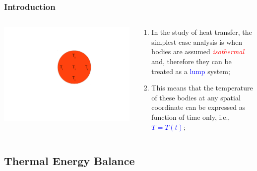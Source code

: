\documentclass[10pt,compress,unknownkeysallowed]{beamer}
\newcommand{\red}{\textcolor{red}}
\newcommand{\blue}{\textcolor{blue}}
\begin{document}
\begin{frame}
 \frametitle{Introduction}
   \begin{columns}
     \begin{column}[l]{0.5\linewidth}
        \begin{center}
          \includegraphics[width=\columnwidth,clip]{./Pics/Lumped1}
        \end{center}
     \end{column}
%
     \begin{column}[l]{0.5\linewidth}
        \begin{enumerate}
           \item<1-> In the study of heat transfer, the simplest case analysis is when bodies are assumed \red{{\it isothermal}} and, therefore they can be treated as a \blue{lump} system;
           \item<1-> This means that the temperature of these bodies at any spatial coordinate can be expressed as function of time only, i.e., \blue{$T=T\left(t\right)$};
        \end{enumerate}
     \end{column}     
   \end{columns}
\end{frame}

\subsection{Thermal Energy Balance}
\end{document}
